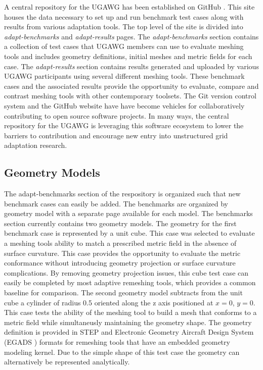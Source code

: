 \documentclass[3p,times,procedia,number]{elsarticle}
\begin{document}
A central repository for the UGAWG has been established on GitHub \cite{ugawg-website}.
This site houses the data necessary to set up and run benchmark test cases along with results from various adaptation tools.
The top level of the site is divided into \emph{adapt-benchmarks} and \emph{adapt-results} pages.
The \emph{adapt-benchmarks} section contains a collection of test cases that UGAWG members can use to evaluate meshing
tools and includes geometry definitions, initial meshes and metric fields for each case.
The \emph{adapt-results} section contains results generated and uploaded by various UGAWG participants using several different meshing tools.
These benchmark cases and the associated results provide the opportunity to evaluate,
compare and contrast meshing tools with other contemporary toolsets.
The Git version control system and the GitHub website have have become
vehicles for collaboratively contributing to open source software
projects.
In many ways, the central repository for the UGAWG is leveraging
this software ecosystem to lower the barriers to contribution
and encourage new entry into unstructured grid adaptation research.

\subsection{Geometry Models}

The adapt-benchmarks section of the respository is organized such that new benchmark cases can easily be added.
The benchmarks are organized by geometry model with a separate page available for each model.
The benchmarks section currently contains two geometry models.
The geometry for the first benchmark case is represented by a unit cube.
This case was selected to evaluate a meshing tools ability to match a prescribed metric field in the absence of surface curvature.
This case provides the opportunity to evaluate the metric conformance without introducing geometry projection or surface curvature complications.
By removing geometry projection issues, this cube test case can easily be completed by most adaptive remeshing tools,
which provides a common baseline for comparison.
The second geometry model subtracts from the unit cube a cylinder of radius 0.5 oriented along the z axis positioned at $x=0$, $y=0$.
This case tests the ability of the meshing tool to build a mesh that conforms to a metric field while simultaneusly maintaining the geometry shape.
The geometry definition is provided in STEP and 
Electronic Geometry Aircraft Design System
(EGADS \cite{haimes-drela-egads})
formats for remeshing tools that have an embedded geometry modeling kernel.
Due to the simple shape of this test case the geometry can alternatively be represented analytically.   
\end{document}
